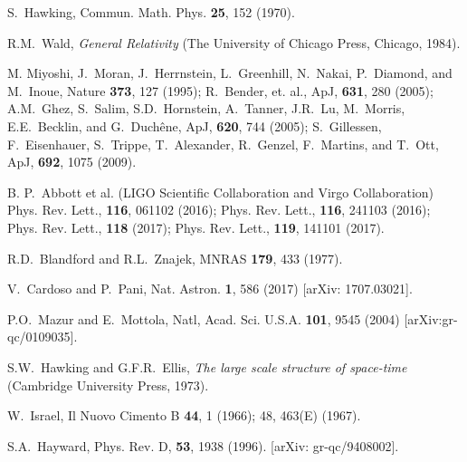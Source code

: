 \documentclass[aps,preprint,preprintnumber,nofootinbib,amsmath,amssymb,ascmac,bm,12pt]{revtex4}
\begin{document}
\begin{thebibliography}{9}

S.~Hawking, Commun. Math. Phys. {\bf 25}, 152 (1970).

R.M.~{Wald}, 
{\it General Relativity} (The University of Chicago Press, Chicago, 1984). 

M. Miyoshi, J.~Moran, J.~Herrnstein, L.~Greenhill, N.~Nakai, P.~Diamond, and M.~Inoue, 
Nature {\bf 373}, 127 (1995); 
R.~Bender, et. al., ApJ, {\bf 631}, 280 (2005); 
A.M.~Ghez, S.~Salim, S.D.~Hornstein, A.~Tanner, J.R.~Lu, M.~Morris, E.E.~Becklin, and G.~Duch\^{e}ne, 
ApJ, {\bf 620}, 744 (2005); 
S.~Gillessen, F.~Eisenhauer, S.~Trippe, T.~Alexander, R.~Genzel, F.~Martins, and T.~Ott, 
ApJ, {\bf 692}, 1075 (2009).

B. P.~Abbott et al. (LIGO Scientific Collaboration and Virgo Collaboration) Phys. Rev. Lett., {\bf 116}, 061102 (2016); 
Phys. Rev. Lett., {\bf 116}, 241103 (2016); Phys. Rev. Lett., {\bf 118} (2017); Phys. Rev. Lett., {\bf 119}, 141101 (2017).

R.D.~Blandford and R.L.~Znajek, MNRAS {\bf 179}, 433 (1977).



V.~Cardoso and P.~Pani, Nat. Astron. {\bf 1}, 586 (2017) [arXiv: 1707.03021].

P.O.~Mazur and E.~Mottola, Natl, Acad. Sci. U.S.A. {\bf 101}, 9545 (2004) [arXiv:gr-qc/0109035].


S.W.~Hawking and G.F.R.~Ellis, {\it The large scale structure of space-time} (Cambridge University Press, 1973).  

W.~Israel, Il Nuovo Cimento B {\bf 44}, 1 (1966); 48, 463(E) (1967).

S.A.~Hayward, Phys. Rev. D, {\bf 53}, 1938 (1996). [arXiv: gr-qc/9408002]. 



\end{thebibliography}
\end{document}
